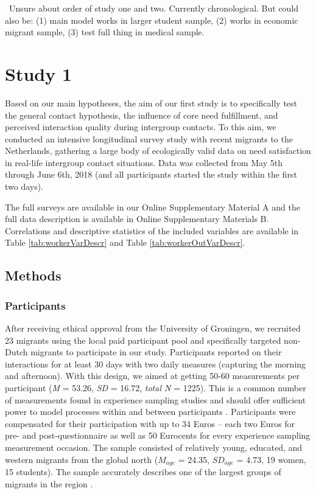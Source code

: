 \faQuestionCircle~Unsure about order of study one and two. Currently
chronological. But could also be: (1) main model works in larger student
sample, (2) works in economic migrant sample, (3) test full thing in
medical sample.

\section{Study 1}

Based on our main hypotheses, the aim of our first study is to
specifically test the general contact hypothesis, the influence of core
need fulfillment, and perceived interaction quality during intergroup
contacts. To this aim, we conducted an intensive longitudinal survey
study with recent migrants to the Netherlands, gathering a large body of
ecologically valid data on need satisfaction in real-life intergroup
contact situations. Data was collected from May 5th through June 6th,
2018 (and all participants started the study within the first two days).

The full surveys are available in our Online Supplementary Material A
and the full data description is available in Online Supplementary
Materials B. Correlations and descriptive statistics of the included
variables are available in Table \ref{tab:workerVarDescr} and Table
\ref{tab:workerOutVarDescr}.

\subsection{Methods}

\subsubsection{Participants}

After receiving ethical approval from the University of Groningen, we
recruited 23 migrants using the local paid participant pool and
specifically targeted non-Dutch migrants to participate in our study.
Participants reported on their interactions for at least 30 days with
two daily measures (capturing the morning and afternoon). With this
design, we aimed at getting 50-60 measurements per participant
(\textit{M} = 53.26, \textit{SD} = 16.72, \textit{total N} = 1225). This
is a common number of measurements found in experience sampling studies
and should offer sufficient power to model processes within and between
participants \citep[e.g., for a systematic review see][]{AanhetRot2012}.
Participants were compensated for their participation with up to 34
Euros -- each two Euros for pre- and post-questionnaire as well as 50
Eurocents for every experience sampling measurement occasion. The sample
consisted of relatively young, educated, and western migrants from the
global north (\(M_{age}\) = 24.35, \(SD_{age}\) = 4.73, 19 women, 15
students). The sample accurately describes one of the largest groups of
migrants in the region \citep[][]{GemeenteGroningen2015}.

